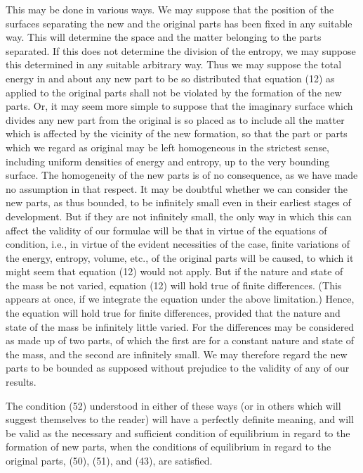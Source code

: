 \documentclass[11pt]{article}
\begin{document}
This may be done in various ways. We may suppose that the position of the surfaces separating the new and the original parts has been fixed in any suitable way. This will determine the space and the matter belonging to the parts separated. If this does not determine the division of the entropy, we may suppose this determined in any suitable arbitrary way. Thus we may suppose the total energy in and about any new part to be so distributed that equation (12) as applied to the original parts shall not be violated by the formation of the new parts. Or, it may seem more simple to suppose that the imaginary surface which divides any new part from the original is so placed as to include all the matter which is affected by the vicinity of the new formation, so that the part or parts which we regard as original may be left homogeneous in the strictest sense, including uniform densities of energy and entropy, up to the very bounding surface. The homogeneity of the new parts is of no consequence, as we have made no assumption in that respect. It may be doubtful whether we can consider the new parts, as thus bounded, to be infinitely small even in their earliest stages of development. But if they are not infinitely small, the only way in which this can affect the validity of our formulae will be that in virtue of the equations of condition, i.e., in virtue of the evident necessities of the case, finite variations of the energy, entropy, volume, etc., of the original parts will be caused, to which it might seem that equation (12) would not apply. But if the nature and state of the mass be not varied, equation (12) will hold true of finite differences. (This appears at once, if we integrate the equation under the above limitation.) Hence, the equation will hold true for finite differences, provided that the nature and state of the mass be infinitely little varied. For the differences may be considered as made up of two parts, of which the first are for a constant nature and state of the mass, and the second are infinitely small. We may therefore regard the new parts to be bounded as supposed without prejudice to the validity of any of our results.

The condition (52) understood in either of these ways (or in others which will suggest themselves to the reader) will have a perfectly definite meaning, and will be valid as the necessary and sufficient condition of equilibrium in regard to the formation of new parts, when the conditions of equilibrium in regard to the original parts, (50), (51), and (43), are satisfied.
\end{document}
